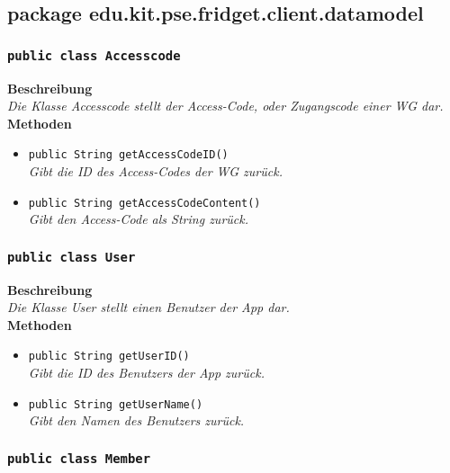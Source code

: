 \subsection{package edu.kit.pse.fridget.client.datamodel}
\subsubsection{\texttt{public class Accesscode}}

	\textbf{Beschreibung} \\
	\textit{Die Klasse Accesscode stellt der Access-Code, oder Zugangscode einer WG dar.} \\

	\textbf{Methoden}
	\begin{itemize}
		\item{\texttt{public String getAccessCodeID()}}\\
		\textit{Gibt die ID des Access-Codes der WG zurück.}\\
		\item{\texttt{public String getAccessCodeContent()}}\\
		\textit{Gibt den Access-Code als String zurück.}\\
	\end{itemize}

	

\subsubsection{\texttt{public class User}}

	\textbf{Beschreibung} \\
	\textit{Die Klasse User stellt einen Benutzer der App dar.}\\

	\textbf{Methoden}
	\begin{itemize}
	\item{\texttt{public String getUserID()}}\\
	\textit{Gibt die ID des Benutzers der App zurück.}\\
	\item{\texttt{public String getUserName()}}\\
	\textit{Gibt den Namen des Benutzers zurück.}\\
	\end{itemize}

	

\subsubsection{\texttt{public class Member}}

